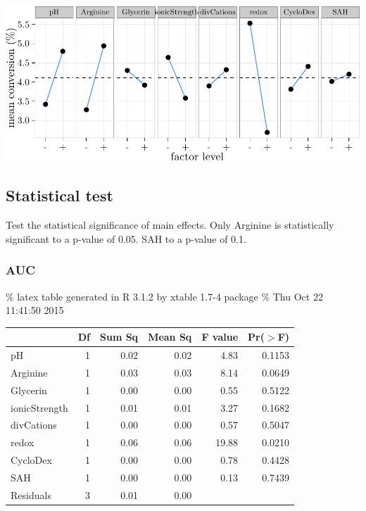 \documentclass[]{article}
\begin{document}
\includegraphics{analysis_files/figure-latex/unnamed-chunk-12-1.pdf}

\subsection{Statistical test}\label{statistical-test-1}

Test the statistical significance of main effects. Only Arginine is
statistically significant to a p-value of 0.05. SAH to a p-value of 0.1.

\subsubsection{AUC}\label{auc-1}

\% latex table generated in R 3.1.2 by xtable 1.7-4 package \% Thu Oct
22 11:41:50 2015

\begin{table}[ht]
\centering
\begin{tabular}{lrrrrr}
  \hline
 & Df & Sum Sq & Mean Sq & F value & Pr($>$F) \\ 
  \hline
pH            & 1 & 0.02 & 0.02 & 4.83 & 0.1153 \\ 
  Arginine      & 1 & 0.03 & 0.03 & 8.14 & 0.0649 \\ 
  Glycerin      & 1 & 0.00 & 0.00 & 0.55 & 0.5122 \\ 
  ionicStrength & 1 & 0.01 & 0.01 & 3.27 & 0.1682 \\ 
  divCations    & 1 & 0.00 & 0.00 & 0.57 & 0.5047 \\ 
  redox         & 1 & 0.06 & 0.06 & 19.88 & 0.0210 \\ 
  CycloDex      & 1 & 0.00 & 0.00 & 0.78 & 0.4428 \\ 
  SAH           & 1 & 0.00 & 0.00 & 0.13 & 0.7439 \\ 
  Residuals     & 3 & 0.01 & 0.00 &  &  \\ 
   \hline
\end{tabular}
\end{table}
\end{document}
